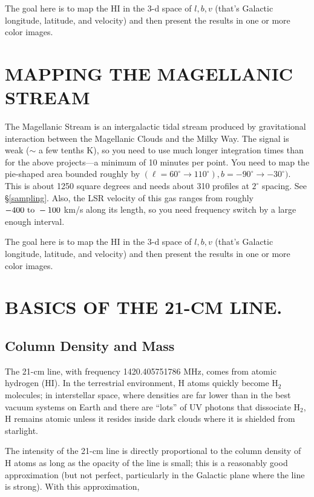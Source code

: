 \documentclass[psfig,preprint]{aastex}
\begin{document}
The goal here is to map the HI in the 3-d space of ${l, b, v}$ (that's
Galactic longitude, latitude, and velocity) and then present the results
in one or more color images.

\section{MAPPING THE MAGELLANIC STREAM}

The Magellanic Stream is an intergalactic tidal stream produced by
gravitational interaction between the Magellanic Clouds and the Milky
Way. The signal is weak ($\sim$ a few tenths K), so you need to use much
longer integration times than for the above projects---a minimum of 10
minutes per point. You need to map the pie-shaped area bounded roughly
by $(\ell=60^\circ \rightarrow 110^\circ), b=-90^\circ \rightarrow
-30^\circ)$. This is about 1250 square degrees and needs about 310
profiles at $2^\circ$ spacing. See \S \ref{sampling}.  Also, the LSR
velocity of this gas ranges from roughly $-400 \ {\rm to} \ -100$ km/s
along its length, so you need frequency switch by a large enough
interval.

The goal here is to map the HI in the 3-d space of ${l, b, v}$ (that's
Galactic longitude, latitude, and velocity) and then present the results
in one or more color images.

\section{BASICS OF THE 21-CM LINE.} \label{basics}

\subsection{Column Density and Mass} \label{coldensity}

	The 21-cm line, with frequency 1420.405751786 MHz, comes from
atomic hydrogen (HI).  In the terrestrial environment, H atoms quickly
become H$_2$ molecules; in interstellar space, where densities are far
lower than in the best vacuum systems on Earth and there are ``lots'' of
UV photons that dissociate H$_2$, H remains atomic unless it resides
inside dark clouds where it is shielded from starlight.

	The intensity of the 21-cm line is directly proportional to the
column density of H atoms as long as the opacity of the line is small;
this is a reasonably good approximation (but not perfect, particularly
in the Galactic plane where the line is strong). With this
approximation, 
\end{document}
